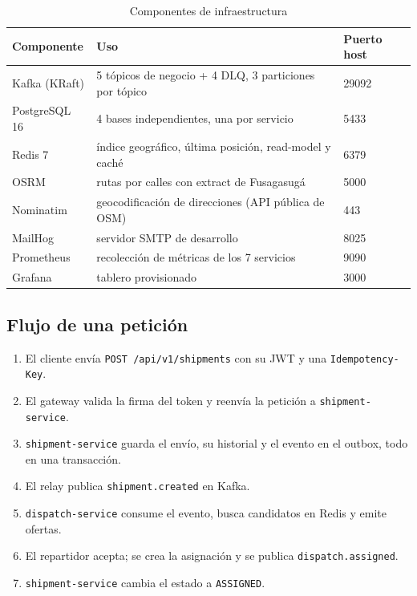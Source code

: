 \documentclass[conference]{IEEEtran}
\newcommand{\pkg}[1]{\texttt{#1}}
\begin{document}
\begin{table}[t]
\centering
\caption{Componentes de infraestructura}
\small
\begin{tabular}{@{}L{3.2cm}L{8.2cm}L{3cm}@{}}
\toprule
\textbf{Componente} & \textbf{Uso} & \textbf{Puerto host}\\
\midrule
Kafka (KRaft) & 5 tópicos de negocio + 4 DLQ, 3 particiones por tópico & 29092\\
PostgreSQL 16 & 4 bases independientes, una por servicio & 5433\\
Redis 7 & índice geográfico, última posición, read-model y caché & 6379\\
OSRM & rutas por calles con extract de Fusagasugá & 5000\\
Nominatim & geocodificación de direcciones (API pública de OSM) & 443\\
MailHog & servidor SMTP de desarrollo & 8025\\
Prometheus & recolección de métricas de los 7 servicios & 9090\\
Grafana & tablero provisionado & 3000\\
\bottomrule
\end{tabular}
\end{table}

\subsection{Flujo de una petición}

\begin{enumerate}[leftmargin=1.2cm]
  \item El cliente envía \pkg{POST /api/v1/shipments} con su JWT y una \pkg{Idempotency-Key}.
  \item El gateway valida la firma del token y reenvía la petición a \pkg{shipment-service}.
  \item \pkg{shipment-service} guarda el envío, su historial y el evento en el outbox, todo en
        una transacción.
  \item El relay publica \pkg{shipment.created} en Kafka.
  \item \pkg{dispatch-service} consume el evento, busca candidatos en Redis y emite ofertas.
  \item El repartidor acepta; se crea la asignación y se publica \pkg{dispatch.assigned}.
  \item \pkg{shipment-service} cambia el estado a \texttt{ASSIGNED}.
\end{enumerate}
\end{document}
